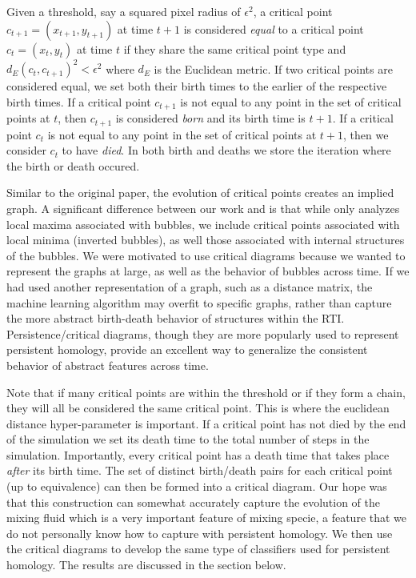 \documentclass[12pt, fullpage,letterpaper]{article}
\theoremstyle{definition}
\begin{document}
	Given a threshold, say a squared pixel radius of $\epsilon^2$, a critical point $c_{t + 1} = (x_{t + 1}, y_{t + 1} )$ at time $t + 1$ is considered \emph{equal} to a critical point $c_t = (x_t, y_t)$ at time $t$ if they share the same critical point type and $d_E(c_t, c_{t + 1})^2 < \epsilon^2$ where $d_E$ is the Euclidean metric. If two critical points are considered equal, we set both their birth times to the earlier of the respective birth times. If a critical point $c_{t + 1}$ is not equal to any point in the set of critical points at $t$, then $c_{t + 1}$ is considered \emph{born} and its birth time is $t + 1$. If a critical point $c_t$ is not equal to any point in the set of critical points at $t + 1$, then we consider $c_t$ to have \emph{died}. In both birth and deaths we store the iteration where the birth or death occured.
	
	Similar to the original paper, the evolution of critical points creates an implied graph. A significant difference between our work and \cite{paper} is that while \cite{paper} only analyzes local maxima associated with bubbles, we include critical points associated with local minima (inverted bubbles), as well those associated with internal structures of the bubbles. We were motivated to use critical diagrams because we wanted to represent the graphs at large, as well as the behavior of bubbles across time. If we had used another representation of a graph, such as a distance matrix, the machine learning algorithm may overfit to specific graphs, rather than capture the more abstract birth-death behavior of structures within the RTI. Persistence/critical diagrams, though they are more popularly used to represent persistent homology, provide an excellent way to generalize the consistent behavior of abstract features across time.
	
	Note that if many critical points are within the threshold or if they form a chain, they will all be considered the same critical point. This is where the euclidean distance hyper-parameter is important. If a critical point has not died by the end of the simulation we set its death time to the total number of steps in the simulation. Importantly, every critical point has a death time that takes place \emph{after} its birth time. The set of distinct birth/death pairs for each critical point (up to equivalence) can then be formed into a critical diagram. Our hope was that this construction can somewhat accurately capture the evolution of the mixing fluid which is a very important feature of mixing specie, a feature that we do not personally know how to capture with persistent homology. We then use the critical diagrams to develop the same type of classifiers used for persistent homology. The results are discussed in the section below.
	
\end{document}
